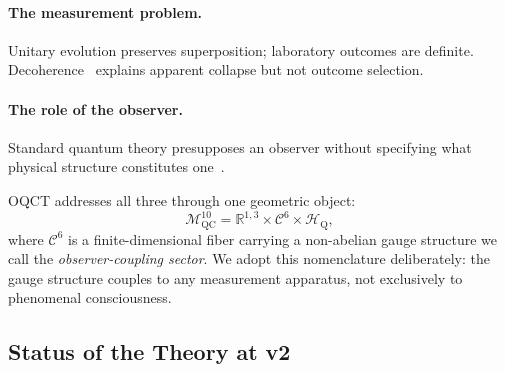 \documentclass[11pt,a4paper]{article}
\theoremstyle{myrmk}
\newcommand{\Mmanifold}{\mathcal{M}^{10}_{\mathrm{QC}}}
\newcommand{\cC}{\mathcal{C}^{6}}
\newcommand{\HH}{\mathcal{H}_{\mathrm{Q}}}
\begin{document}
\paragraph{The measurement problem.} Unitary evolution preserves superposition;
laboratory outcomes are definite. Decoherence~\cite{Zurek2003} explains apparent
collapse but not outcome selection.

\paragraph{The role of the observer.} Standard quantum theory presupposes an observer
without specifying what physical structure constitutes one~\cite{vonNeumann1932}.

OQCT addresses all three through one geometric object:
\begin{equation}
  \Mmanifold = \mathbb{R}^{1,3}\times\cC\times\HH,
  \label{eq:manifold}
\end{equation}
where $\cC$ is a finite-dimensional fiber carrying a non-abelian gauge structure we
call the \emph{observer-coupling sector}. We adopt this nomenclature deliberately:
the gauge structure couples to any measurement apparatus, not exclusively to phenomenal
consciousness.

\subsection{Status of the Theory at v2}
\end{document}
